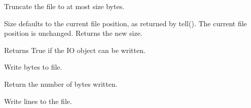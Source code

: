 \documentclass[letterpaper,10pt,english]{sphinxmanual}
\begin{document}
\begin{fulllineitems}
\begin{fulllineitems}
\label{\detokenize{modules/src.pig_sorting_api.main:src.pig_sorting_api.main.BytesIO.truncate}}
\pysigstartsignatures
\pysiglinewithargsret
{}
{\sphinxparamcomma {}}
{}
\pysigstopsignatures
\sphinxAtStartPar
Truncate the file to at most size bytes.

\sphinxAtStartPar
Size defaults to the current file position, as returned by tell().
The current file position is unchanged.  Returns the new size.

\end{fulllineitems}


\begin{fulllineitems}
\label{\detokenize{modules/src.pig_sorting_api.main:src.pig_sorting_api.main.BytesIO.writable}}
\pysigstartsignatures
\pysiglinewithargsret
{}
{}
{}
\pysigstopsignatures
\sphinxAtStartPar
Returns True if the IO object can be written.

\end{fulllineitems}


\begin{fulllineitems}
\label{\detokenize{modules/src.pig_sorting_api.main:src.pig_sorting_api.main.BytesIO.write}}
\pysigstartsignatures
\pysiglinewithargsret
{}
{\sphinxparamcomma {}}
{}
\pysigstopsignatures
\sphinxAtStartPar
Write bytes to file.

\sphinxAtStartPar
Return the number of bytes written.

\end{fulllineitems}


\begin{fulllineitems}
\label{\detokenize{modules/src.pig_sorting_api.main:src.pig_sorting_api.main.BytesIO.writelines}}
\pysigstartsignatures
\pysiglinewithargsret
{}
{\sphinxparamcomma {}}
{}
\pysigstopsignatures
\sphinxAtStartPar
Write lines to the file.


\end{fulllineitems}
\end{fulllineitems}
\end{document}
